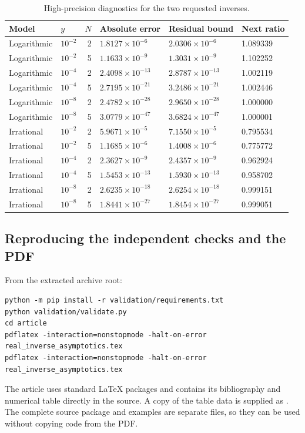 \documentclass[11pt,a4paper]{article}
\numberwithin{equation}{section}
\theoremstyle{definition}\newtheorem{definition}[theorem]{Definition}
\theoremstyle{remark}\newtheorem{remark}[theorem]{Remark}
\newcommand{\code}[1]{\texttt{\detokenize{#1}}}
\begin{document}
\begin{table}[htbp]
\centering\small
\caption{High-precision diagnostics for the two requested inverses.}\label{tab:numerical}
\begin{tabular}{@{}llrlll@{}}
\toprule
Model & $y$ & $N$ & Absolute error & Residual bound & Next ratio \\\midrule
Logarithmic & $10^{-2}$ & 2 & $1.8127\times10^{-6}$ & $2.0306\times10^{-6}$ & 1.089339 \\
Logarithmic & $10^{-2}$ & 5 & $1.1633\times10^{-9}$ & $1.3031\times10^{-9}$ & 1.102252 \\
Logarithmic & $10^{-4}$ & 2 & $2.4098\times10^{-13}$ & $2.8787\times10^{-13}$ & 1.002119 \\
Logarithmic & $10^{-4}$ & 5 & $2.7195\times10^{-21}$ & $3.2486\times10^{-21}$ & 1.002446 \\
Logarithmic & $10^{-8}$ & 2 & $2.4782\times10^{-28}$ & $2.9650\times10^{-28}$ & 1.000000 \\
Logarithmic & $10^{-8}$ & 5 & $3.0779\times10^{-47}$ & $3.6824\times10^{-47}$ & 1.000001 \\
Irrational & $10^{-2}$ & 2 & $5.9671\times10^{-5}$ & $7.1550\times10^{-5}$ & 0.795534 \\
Irrational & $10^{-2}$ & 5 & $1.1685\times10^{-6}$ & $1.4008\times10^{-6}$ & 0.775772 \\
Irrational & $10^{-4}$ & 2 & $2.3627\times10^{-9}$ & $2.4357\times10^{-9}$ & 0.962924 \\
Irrational & $10^{-4}$ & 5 & $1.5453\times10^{-13}$ & $1.5930\times10^{-13}$ & 0.958702 \\
Irrational & $10^{-8}$ & 2 & $2.6235\times10^{-18}$ & $2.6254\times10^{-18}$ & 0.999151 \\
Irrational & $10^{-8}$ & 5 & $1.8441\times10^{-27}$ & $1.8454\times10^{-27}$ & 0.999051 \\
\bottomrule
\end{tabular}
\end{table}

\subsection{Reproducing the independent checks and the PDF}
From the extracted archive root:
\begin{lstlisting}[language={}]
python -m pip install -r validation/requirements.txt
python validation/validate.py
cd article
pdflatex -interaction=nonstopmode -halt-on-error real_inverse_asymptotics.tex
pdflatex -interaction=nonstopmode -halt-on-error real_inverse_asymptotics.tex
\end{lstlisting}
The article uses standard LaTeX packages and contains its bibliography and numerical table directly in the source. A copy of the table data is supplied as \code{numerical_table.tex}. The complete source package and examples are separate files, so they can be used without copying code from the PDF.
\end{document}
